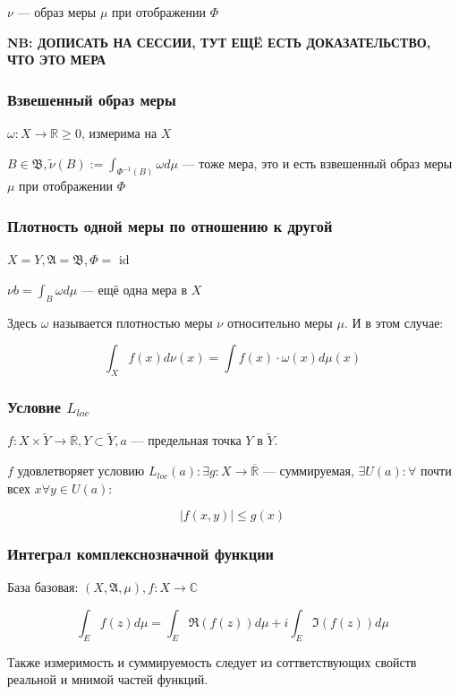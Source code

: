 \documentclass{article}
\def\rinf{\overline{\mathbb{R}}}
\begin{document}
$\nu$ --- образ меры $\mu$ при отображении $\Phi$

\textbf{NB: ДОПИСАТЬ НА СЕССИИ, ТУТ ЕЩË ЕСТЬ ДОКАЗАТЕЛЬСТВО, ЧТО ЭТО МЕРА}

\subsubsection{Взвешенный образ меры}

$\omega: X \rightarrow \mathbb{R} \ge 0$, измерима на $X$

$B \in \mathfrak{B}, \tilde{\nu}(B) := \int_{\Phi^{-1}(B)} \omega d\mu$ --- тоже мера, это и есть взвешенный образ меры $\mu$ при отображении $\Phi$

\subsubsection{Плотность одной меры по отношению к другой}

$X = Y, \mathfrak{A} = \mathfrak{B}, \Phi = $ id

$\nu b = \int_{B} \omega d \mu$ --- ещё одна мера в $X$

Здесь $\omega$ называется плотностью меры $\nu$ относительно меры $\mu$. И в этом случае:

\[\int_{X}f(x)d\nu(x) = \int f(x) \cdot \omega(x) d\mu(x)\]

\subsubsection{Условие $L_{loc}$}

$f: X \times \tilde{Y} \rightarrow \rinf, Y \subset \tilde{Y}, a$ --- предельная точка $Y$ в $\tilde{Y}$. 

$f$ удовлетворяет условию $L_{loc}(a): \exists g: X \rightarrow \rinf$ --- суммируемая, $\exists U(a): \forall$ почти всех $x \forall y \in U(a)$:

\[|f(x, y)| \le g(x)\]

\subsubsection{Интеграл комплекснозначной функции}

База базовая: $(X, \mathfrak{A}, \mu), f: X \rightarrow \mathbb{C}$

\[\int_{E}f(z)d\mu = \int_{E}\Re(f(z))d\mu + i\int_{E}\Im(f(z))d\mu\]

Также измеримость и суммируемость следует из соттветствующих свойств реальной и мнимой частей функций.
\end{document}

